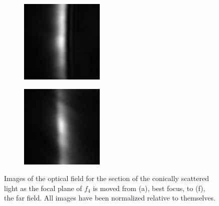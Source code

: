 \begin{figure}[ht]
\begin{subfigure}[b]{4cm}
  \end{subfigure}
  \begin{subfigure}[b]{4cm}
    \includegraphics[width=4cm,keepaspectratio]{interference/figures/move/321-8.png}
    \caption{}
  \end{subfigure}
  \begin{subfigure}[b]{4cm}
    \includegraphics[width=4cm,keepaspectratio]{interference/figures/move/321-9.png}
    \caption{}
  \end{subfigure}
  \caption{Images of the optical field for the section of the conically
    scattered light as the focal plane of $f_4$ is moved from (a), best focus,
    to (f), the far field.  All images have been normalized relative to
    themselves.}
  \label{fig:321up}
\end{figure}

